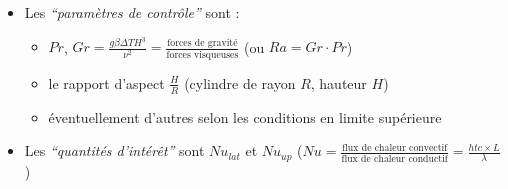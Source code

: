 \begin{frame}[fragile]
\begin{itemize}
\begin{columns}[T]
\begin{column}{0.58\textwidth}
    \end{column}
    \begin{column}{0.42\textwidth}
\begin{scriptsize}
    Bilan thermique intégral :
    \begin{equation*} mCp \frac{d\bar{T}}{dt} = \phi^{met}_{dwn} S^{met}_{dwn} - \phi^{met}_{lat} S^{met}_{lat} - \phi^{met}_{up} S^{met}_{up} \end{equation*}
\end{scriptsize}
    \end{column}
\end{columns}
\item Les \emph{``paramètres de contrôle''} sont :
\begin{itemize}
\item $Pr$, $Gr=\frac{g\beta\Delta T H^3}{\nu^2}=\frac{\text{forces de gravité}}{\text{forces visqueuses}}$ (ou $Ra=Gr \cdot Pr$)
\item le rapport d'aspect $\frac{H}{R}$ (cylindre de rayon $R$, hauteur $H$)
\item éventuellement d'autres selon les conditions en limite supérieure
\end{itemize}
\item Les \emph{``quantités d'intérêt''} sont $Nu_{lat}$ et $Nu_{up}$ ($Nu=\frac{\text{flux de chaleur convectif}}{\text{flux de chaleur conductif}}=\frac{htc \times L}{\lambda}$ )
\end{itemize}
\end{frame}
